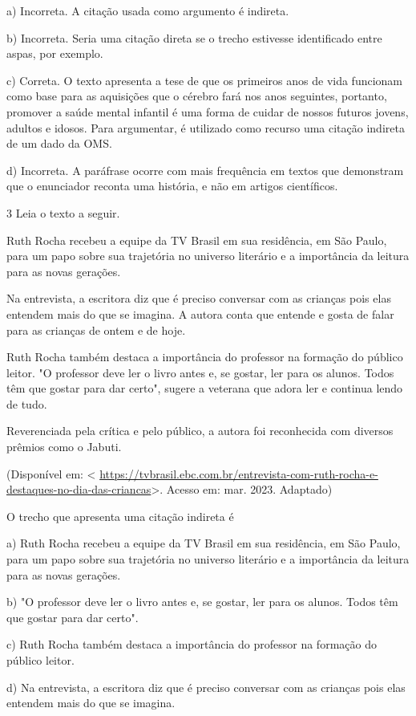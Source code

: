 {a) Incorreta. A citação usada como argumento é indireta.

b) Incorreta. Seria uma citação direta se o trecho estivesse
identificado entre aspas, por exemplo.

c) Correta. O texto apresenta a tese de que os primeiros anos de vida
funcionam como base para as aquisições que o cérebro fará nos anos
seguintes, portanto, promover a saúde mental infantil é uma forma de
cuidar de nossos futuros jovens, adultos e idosos. Para argumentar, é
utilizado como recurso uma citação indireta de um dado da OMS.

d) Incorreta. A paráfrase ocorre com mais frequência em textos que
demonstram que o enunciador reconta uma história, e não em artigos
científicos.

\num{3} Leia o texto a seguir.

Ruth Rocha recebeu a equipe da TV Brasil em sua residência, em São
Paulo, para um papo sobre sua trajetória no universo literário e a
importância da leitura para as novas gerações.

Na entrevista, a escritora diz que é preciso conversar com as crianças
pois elas entendem mais do que se imagina. A autora conta que entende e
gosta de falar para as crianças de ontem e de hoje.

Ruth Rocha também destaca a importância do professor na formação do
público leitor. "O professor deve ler o livro antes e, se gostar, ler
para os alunos. Todos têm que gostar para dar certo", sugere a veterana
que adora ler e continua lendo de tudo.

Reverenciada pela crítica e pelo público, a autora foi reconhecida com
diversos prêmios como o Jabuti.

(Disponível em: \textless{}
\url{https://tvbrasil.ebc.com.br/entrevista-com-ruth-rocha-e-destaques-no-dia-das-criancas}\textgreater.
Acesso em: mar. 2023. Adaptado)

O trecho que apresenta uma citação indireta é

a) Ruth Rocha recebeu a equipe da TV Brasil em sua residência, em São
Paulo, para um papo sobre sua trajetória no universo literário e a
importância da leitura para as novas gerações.

b) "O professor deve ler o livro antes e, se gostar, ler para os alunos.
Todos têm que gostar para dar certo".

c) Ruth Rocha também destaca a importância do professor na formação do
público leitor.

d) Na entrevista, a escritora diz que é preciso conversar com as
crianças pois elas entendem mais do que se imagina.

}
